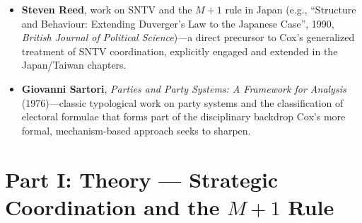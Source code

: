\documentclass[12pt]{article}
\begin{document}
\begin{itemize}[leftmargin=*, itemsep=4pt]
    \item \textbf{Steven Reed}, work on SNTV and the $M+1$ rule in Japan (e.g., ``Structure and Behaviour: Extending Duverger's Law to the Japanese Case'', 1990, \textit{British Journal of Political Science})---a direct precursor to Cox's generalized treatment of SNTV coordination, explicitly engaged and extended in the Japan/Taiwan chapters.
    \item \textbf{Giovanni Sartori}, \textit{Parties and Party Systems: A Framework for Analysis} (1976)---classic typological work on party systems and the classification of electoral formulae that forms part of the disciplinary backdrop Cox's more formal, mechanism-based approach seeks to sharpen.
\end{itemize}

\section{Part I: Theory --- Strategic Coordination and the $M+1$ Rule}
\end{document}
